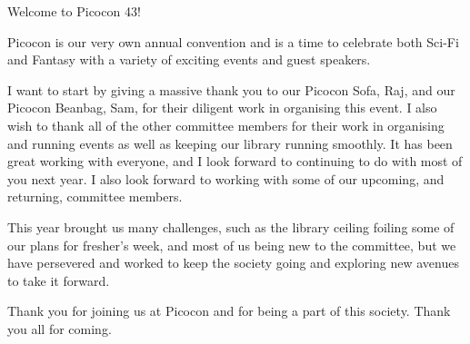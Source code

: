 Welcome to Picocon 43! 


Picocon is our very own annual convention and is a time to celebrate both Sci-Fi and Fantasy with a variety of exciting events and guest speakers. 

I want to start by giving a massive thank you to our Picocon Sofa, Raj, and our Picocon Beanbag, Sam, for their diligent work in organising this event. I also wish to thank all of the other committee members for their work in organising and running events as well as keeping our library running smoothly. It has been great working with everyone, and I look forward to continuing to do with most of you next year. I also look forward to working with some of our upcoming, and returning, committee members. 

This year brought us many challenges, such as the library ceiling foiling some of our plans for fresher's week, and most of us being new to the committee, but we have persevered and worked to keep the society going and exploring new avenues to take it forward. 

Thank you for joining us at Picocon and for being a part of this society. Thank you all for coming.




